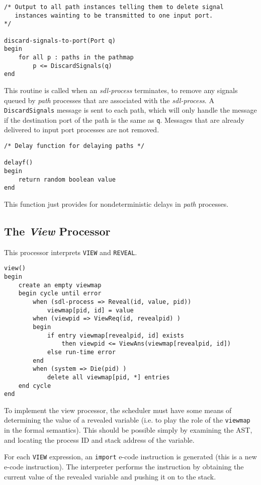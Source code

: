 \begin{verbatim}
/* Output to all path instances telling them to delete signal
   instances wainting to be transmitted to one input port.
*/

discard-signals-to-port(Port q)
begin
    for all p : paths in the pathmap
        p <= DiscardSignals(q)
end
\end{verbatim}

This routine is called when an {\em sdl-process} terminates, to
remove any signals queued by {\em path} processes that are associated
with the {\em sdl-process}.
A {\tt DiscardSignals} message is sent to
each path, which will only handle the message if the destination port
of the path is the same as {\tt q}. Messages that are already
delivered to input port processes are not removed.

\begin{verbatim}
/* Delay function for delaying paths */

delayf()
begin
    return random boolean value
end
\end{verbatim}

This function just provides for nondeterministic delays in {\em path}
processes.

\subsection{The {\em View} Processor}
\label{viewproc}

This processor interprets {\tt VIEW} and {\tt REVEAL}.

\begin{verbatim}
view()
begin
    create an empty viewmap
    begin cycle until error
        when (sdl-process => Reveal(id, value, pid))
            viewmap[pid, id] = value
        when (viewpid => ViewReq(id, revealpid) )
        begin
            if entry viewmap[revealpid, id] exists
                then viewpid <= ViewAns(viewmap[revealpid, id])
            else run-time error
        end
        when (system => Die(pid) )
            delete all viewmap[pid, *] entries
    end cycle
end
\end{verbatim}

To implement the view processor, the scheduler must have some
means of determining the value of a revealed variable (i.e.
to play the role of the {\tt viewmap} in the formal semantics).
This should be possible simply by examining the AST, and
locating the process ID and stack address of the variable.

For each {\tt VIEW} expression, an {\tt import} e-code
instruction is generated (this is a new e-code instruction).
The interpreter performs the instruction by obtaining the
current value of the revealed variable and pushing it on to
the stack.

